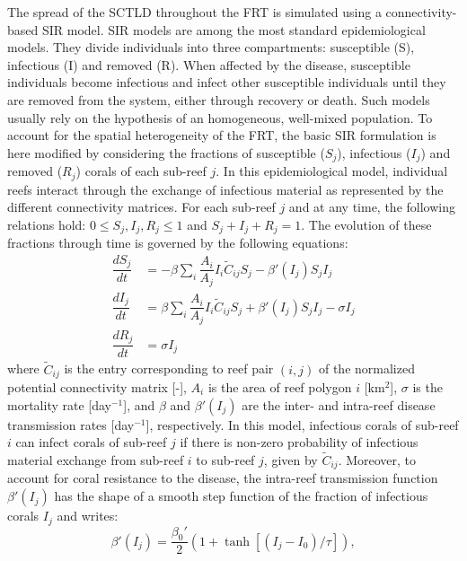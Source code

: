\documentclass[utf8]{frontiersSCNS}
\begin{document}
The spread of the SCTLD throughout the FRT is simulated using a connectivity-based \cite{kermack1927contribution} SIR model. SIR models are among the most standard epidemiological models. They divide individuals into three compartments: susceptible (S), infectious (I) and removed (R). When affected by the disease, susceptible individuals become infectious and infect other susceptible individuals until they are removed from the system, either through recovery or death. Such models usually rely on the hypothesis of an homogeneous, well-mixed population. To account for the spatial heterogeneity of the FRT, the basic SIR formulation is here modified by considering the fractions of susceptible ($S_j$), infectious ($I_j$) and removed ($R_j$) corals of each sub-reef $j$. In this epidemiological model, individual reefs interact through the exchange of infectious material as represented by the different connectivity matrices. For each sub-reef $j$ and at any time, the following relations hold: $0\leq S_j,I_j,R_j\leq 1$ and $S_j+I_j+R_j=1$. The evolution of these fractions through time is governed by the following equations:
\begin{equation}
    \begin{aligned}
        \dfrac{dS_j}{dt} &= -\beta\sum_i\dfrac{A_i}{A_j}I_i\tilde{C}_{ij}S_j - \beta'(I_j)S_jI_j \\
        \dfrac{dI_j}{dt} &= \beta\sum_i\dfrac{A_i}{A_j}I_i\tilde{C}_{ij}S_j + \beta'(I_j)S_jI_j - \sigma I_j \\
        \dfrac{dR_j}{dt} &= \sigma I_j
    \end{aligned}\label{eq:epidemio}
\end{equation}
where $\tilde{C}_{ij}$ is the entry corresponding to reef pair $(i,j)$ of the normalized potential connectivity matrix [-], $A_i$ is the area of reef polygon $i$ [km$^2$], $\sigma$ is the mortality rate [day$^{-1}$], and $\beta$ and $\beta'(I_j)$ are the inter- and intra-reef disease transmission rates [day$^{-1}$], respectively. In this model, infectious corals of sub-reef $i$ can infect corals of sub-reef $j$ if there is non-zero probability of infectious material exchange from sub-reef $i$ to sub-reef $j$, given by $\tilde{C}_{ij}$. Moreover, to account for coral resistance to the disease, the intra-reef transmission function $\beta'(I_j)$ has the shape of a smooth step function of the fraction of infectious corals $I_j$ and writes:
\begin{equation}
    \beta'(I_j) = \dfrac{\beta_0'}{2}(1+\tanh[(I_j-I_0)/\tau]),\label{eq:beta}
\end{equation}
\end{document}
